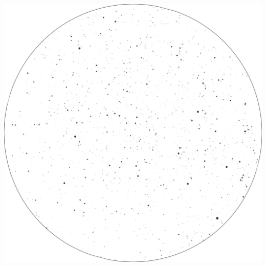 \documentclass{./SAS-class-skygen}
\begin{document}
	\vspace{0.5cm}
    \begin{center}
    \includegraphics[width=\textwidth]{./pics/skychart27.png}
    \end{center}
    
    
\end{document}
